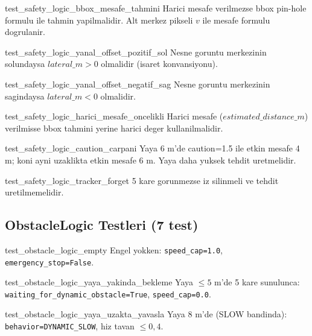 \documentclass[a4paper,12pt]{article}
\begin{document}
\begin{testbox}{test\_safety\_logic\_bbox\_mesafe\_tahmini}
Harici mesafe verilmezse bbox pin-hole formulu ile tahmin yapilmalidir.
Alt merkez pikseli $v$ ile mesafe formulu dogrulanir.
\end{testbox}

\begin{testbox}{test\_safety\_logic\_yanal\_offset\_pozitif\_sol}
Nesne goruntu merkezinin solundaysa $lateral\_m > 0$ olmalidir (isaret konvansiyonu).
\end{testbox}

\begin{testbox}{test\_safety\_logic\_yanal\_offset\_negatif\_sag}
Nesne goruntu merkezinin sagindaysa $lateral\_m < 0$ olmalidir.
\end{testbox}

\begin{testbox}{test\_safety\_logic\_harici\_mesafe\_oncelikli}
Harici mesafe ($estimated\_distance\_m$) verilmisse bbox tahmini
yerine harici deger kullanilmalidir.
\end{testbox}

\begin{testbox}{test\_safety\_logic\_caution\_carpani}
Yaya 6 m'de caution=1.5 ile etkin mesafe 4 m; koni ayni uzaklikta
etkin mesafe 6 m. Yaya daha yuksek tehdit uretmelidir.
\end{testbox}

\begin{testbox}{test\_safety\_logic\_tracker\_forget}
5 kare gorunmezse iz silinmeli ve tehdit uretilmemelidir.
\end{testbox}

\subsection{ObstacleLogic Testleri (7 test)}

\begin{testbox}{test\_obstacle\_logic\_empty}
Engel yokken: \texttt{speed\_cap=1.0}, \texttt{emergency\_stop=False}.
\end{testbox}

\begin{testbox}{test\_obstacle\_logic\_yaya\_yakinda\_bekleme}
Yaya $\leq 5$ m'de 5 kare sunulunca:
\texttt{waiting\_for\_dynamic\_obstacle=True}, \texttt{speed\_cap=0.0}.
\end{testbox}

\begin{testbox}{test\_obstacle\_logic\_yaya\_uzakta\_yavasla}
Yaya 8 m'de (SLOW bandinda): \texttt{behavior=DYNAMIC\_SLOW},
hiz tavan $\leq 0{,}4$.
\end{testbox}
\end{document}
